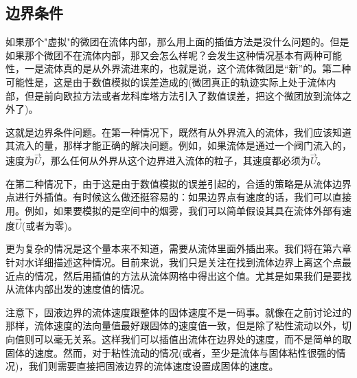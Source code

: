 \documentclass{article}
\begin{document}
\subsection{边界条件}
如果那个"虚拟"的微团在流体内部，那么用上面的插值方法是没什么问题的。但是如果那个微团不在流体内部，那又会怎么样呢？会发生这种情况基本有两种可能性，一是流体真的是从外界流进来的，也就是说，这个流体微团是“新”的。第二种可能性是，这是由于数值模拟的误差造成的(微团真正的轨迹实际上处于流体内部，但是前向欧拉方法或者龙科库塔方法引入了数值误差，把这个微团放到流体之外了)。
\par
这就是边界条件问题。在第一种情况下，既然有从外界流入的流体，我们应该知道其流入的量，那样才能正确的解决问题。例如，如果流体是通过一个阀门流入的，速度为$\vec{U}$，那么任何从外界从这个边界进入流体的粒子，其速度都必须为$\vec{U}$。
\par
在第二种情况下，由于这是由于数值模拟的误差引起的，合适的策略是从流体边界点进行外插值。有时候这么做还挺容易的：如果边界点有速度的话，我们可以直接用。例如，如果要模拟的是空间中的烟雾，我们可以简单假设其具在流体外部有速度$\vec{U}$(或者为零)。
\par
更为复杂的情况是这个量本来不知道，需要从流体里面外插出来。我们将在第六章针对水详细描述这种情况。目前来说，我们只是关注在找到流体边界上离这个点最近点的情况，然后用插值的方法从流体网格中得出这个值。尤其是如果我们是要找从流体内部出发的速度值的情况。
\par
注意下，固液边界的流体速度跟整体的固体速度不是一码事。就像在之前讨论过的那样，流体速度的法向量值最好跟固体的速度值一致，但是除了粘性流动以外，切向值则可以毫无关系。这样我们可以插值出流体在边界处的速度，而不是简单的取固体的速度。然而，对于粘性流动的情况(或者，至少是流体与固体粘性很强的情况)，我们则需要直接把固液边界的流体速度设置成固体的速度。
\end{document}
